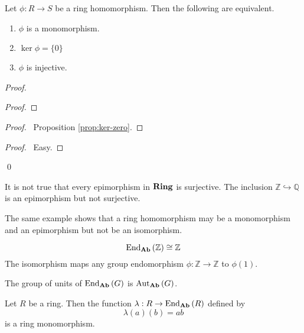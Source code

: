 \begin{prop}
Let $\phi : R \rightarrow S$ be a ring homomorphism. Then the following are equivalent.
\begin{enumerate}
\item $\phi$ is a monomorphism.
\item $\ker \phi = \{0\}$
\item $\phi$ is injective.
\end{enumerate}
\end{prop}

\begin{proof}
\pf
{}
\begin{proof}
\end{proof}
\begin{proof}
	\pf\ Proposition \ref{prop:ker-zero}.
\end{proof}
\begin{proof}
	\pf\ Easy.
\end{proof}
\qed
\end{proof}

\begin{ex}
It is not true that every epimorphism in $\mathbf{Ring}$ is surjective. The inclusion $\mathbb{Z} \hookrightarrow \mathbb{Q}$ is an epimorphism but not surjective.

The same example shows that a ring homomorphism may be a monomorphism and an epimorphism but not be an isomorphism.
\end{ex}

\begin{ex}
\[ \mathrm{End}_{\mathbf{Ab}} \left( {\mathbb{Z}} \right) \cong \mathbb{Z} \]
The isomorphism maps any group endomorphism $\phi : \mathbb{Z} \rightarrow \mathbb{Z}$ to $\phi(1)$.
\end{ex}

\begin{ex}
The group of units of $\mathrm{End}_{\mathbf{Ab}} \left( {G} \right)$ is $\mathrm{Aut}_{\mathbf{Ab}} \left( {G} \right)$.
\end{ex}

\begin{ex}
Let $R$ be a ring. Then the function $\lambda : R \rightarrow \mathrm{End}_{\mathbf{Ab}} \left( {R} \right)$ defined by
\[ \lambda(a)(b) = ab \]
is a ring monomorphism.
\end{ex}
 
